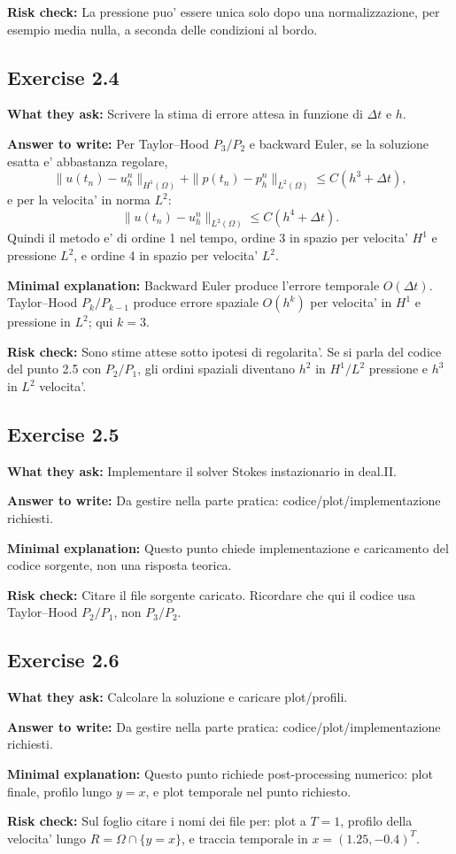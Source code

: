 \documentclass[11pt,a4paper]{article}
\begin{document}
\textbf{Risk check:}
La pressione puo' essere unica solo dopo una normalizzazione, per esempio media nulla, a seconda delle condizioni al bordo.

\subsection*{Exercise 2.4}
\textbf{What they ask:} Scrivere la stima di errore attesa in funzione di \(\Delta t\) e \(h\).

\textbf{Answer to write:}
Per Taylor--Hood \(P_3/P_2\) e backward Euler, se la soluzione esatta e' abbastanza regolare,
\[
\|u(t_n)-u_h^n\|_{H^1(\Omega)}
+\|p(t_n)-p_h^n\|_{L^2(\Omega)}
\le C(h^3+\Delta t),
\]
e per la velocita' in norma \(L^2\):
\[
\|u(t_n)-u_h^n\|_{L^2(\Omega)}
\le C(h^4+\Delta t).
\]
Quindi il metodo e' di ordine 1 nel tempo, ordine 3 in spazio per velocita' \(H^1\) e pressione \(L^2\), e ordine 4 in spazio per velocita' \(L^2\).

\textbf{Minimal explanation:}
Backward Euler produce l'errore temporale \(O(\Delta t)\). Taylor--Hood \(P_k/P_{k-1}\) produce errore spaziale \(O(h^k)\) per velocita' in \(H^1\) e pressione in \(L^2\); qui \(k=3\).

\textbf{Risk check:}
Sono stime attese sotto ipotesi di regolarita'. Se si parla del codice del punto 2.5 con \(P_2/P_1\), gli ordini spaziali diventano \(h^2\) in \(H^1/L^2\) pressione e \(h^3\) in \(L^2\) velocita'.

\subsection*{Exercise 2.5}
\textbf{What they ask:} Implementare il solver Stokes instazionario in deal.II.

\textbf{Answer to write:}
Da gestire nella parte pratica: codice/plot/implementazione richiesti.

\textbf{Minimal explanation:}
Questo punto chiede implementazione e caricamento del codice sorgente, non una risposta teorica.

\textbf{Risk check:}
Citare il file sorgente caricato. Ricordare che qui il codice usa Taylor--Hood \(P_2/P_1\), non \(P_3/P_2\).

\subsection*{Exercise 2.6}
\textbf{What they ask:} Calcolare la soluzione e caricare plot/profili.

\textbf{Answer to write:}
Da gestire nella parte pratica: codice/plot/implementazione richiesti.

\textbf{Minimal explanation:}
Questo punto richiede post-processing numerico: plot finale, profilo lungo \(y=x\), e plot temporale nel punto richiesto.

\textbf{Risk check:}
Sul foglio citare i nomi dei file per: plot a \(T=1\), profilo della velocita' lungo \(R=\Omega\cap\{y=x\}\), e traccia temporale in \(x=(1.25,-0.4)^T\).
\end{document}

